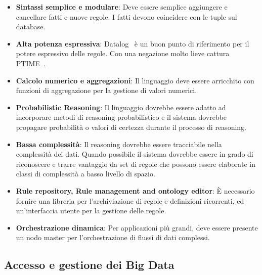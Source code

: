 \begin{itemize}
	\item \textbf{Sintassi semplice e modulare}: Deve essere semplice aggiungere e cancellare fatti e nuove regole. I fatti devono coincidere con le tuple sul database.
	\item \textbf{Alta potenza espressiva}: Datalog~\cite{ceri2012logic, huang2011datalog} è un buon punto di riferimento per il potere espressivo delle regole. Con una negazione molto lieve cattura PTIME~\cite{dantsin2001complexity}.
	\item \textbf{Calcolo numerico e aggregazioni}: Il linguaggio deve essere arricchito con funzioni di aggregazione per la gestione di valori numerici.
	\item \textbf{Probabilistic Reasoning}: Il linguaggio dovrebbe essere adatto ad incorporare metodi di reasoning probabilistico e il sistema dovrebbe propagare probabilità o valori di certezza durante il processo di reasoning.
	\item \textbf{Bassa complessità}: Il reasoning dovrebbe essere tracciabile nella complessità dei dati. Quando possibile il sistema dovrebbe essere in grado di riconoscere e trarre vantaggio da set di regole che possono essere elaborate in classi di complessità a basso livello di spazio. 
	\item \textbf{Rule repository, Rule management and ontology editor}: È necessario fornire una libreria per l'archiviazione di regole e definizioni ricorrenti, ed un'interfaccia utente per la gestione delle regole.
	\item \textbf{Orchestrazione dinamica}: Per applicazioni più grandi, deve essere presente un nodo master per l'orchestrazione di flussi di dati complessi.
\end{itemize}

\subsection{Accesso e gestione dei Big Data}

